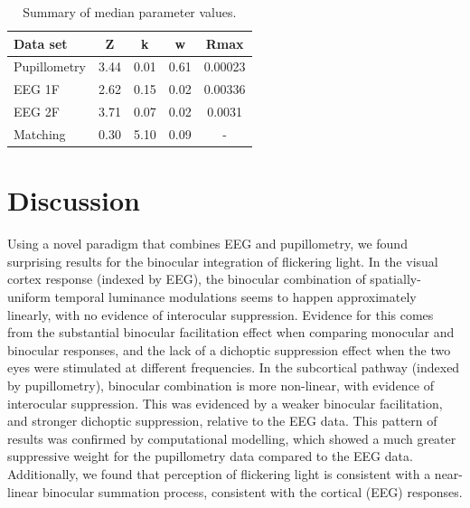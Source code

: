 \documentclass[
]{article}
\begin{document}
\begin{table}

\caption{\label{tab:paramtable}Summary of median parameter values.}
\centering
\begin{tabular}[t]{l|c|c|c|c}
\hline
Data set & Z & k & w & Rmax\\
\hline
Pupillometry & 3.44 & 0.01 & 0.61 & 0.00023\\
\hline
EEG 1F & 2.62 & 0.15 & 0.02 & 0.00336\\
\hline
EEG 2F & 3.71 & 0.07 & 0.02 & 0.0031\\
\hline
Matching & 0.30 & 5.10 & 0.09 & -\\
\hline
\end{tabular}
\end{table}

\hypertarget{discussion}{%
\section{Discussion}\label{discussion}}

Using a novel paradigm that combines EEG and pupillometry, we found surprising results for the binocular integration of flickering light. In the visual cortex response (indexed by EEG), the binocular combination of spatially-uniform temporal luminance modulations seems to happen approximately linearly, with no evidence of interocular suppression. Evidence for this comes from the substantial binocular facilitation effect when comparing monocular and binocular responses, and the lack of a dichoptic suppression effect when the two eyes were stimulated at different frequencies. In the subcortical pathway (indexed by pupillometry), binocular combination is more non-linear, with evidence of interocular suppression. This was evidenced by a weaker binocular facilitation, and stronger dichoptic suppression, relative to the EEG data. This pattern of results was confirmed by computational modelling, which showed a much greater suppressive weight for the pupillometry data compared to the EEG data. Additionally, we found that perception of flickering light is consistent with a near-linear binocular summation process, consistent with the cortical (EEG) responses.
\end{document}
